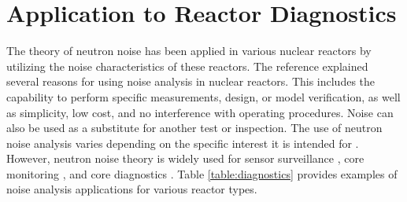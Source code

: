 \section{Application to Reactor Diagnostics}

The theory of neutron noise has been applied in various nuclear reactors by utilizing the noise characteristics of these reactors. The reference \cite{thiePowerReactorNoise1981} explained several reasons for using noise analysis in nuclear reactors. This includes the capability to perform specific measurements, design, or model verification, as well as simplicity, low cost, and no interference with operating procedures. Noise can also be used as a substitute for another test or inspection. The use of neutron noise analysis varies depending on the specific interest it is intended for \cite{torresNeutronNoiseAnalysis2019}. However, neutron noise theory is widely used for sensor surveillance \cite{hashemianMeasurementDynamicTemperatures2011, hashemianPracticalReviewMethods2010, montalvoAdvancedSurveillanceResistance2014}, core monitoring \cite{czibokRegularNeutronNoise2003, hashemianOnlineMonitoringApplications2011, ortiz-villafuerteBWROnlineMonitoring2006}, and core diagnostics \cite{pazsitDevelopmentsCoreBarrelMotion2016, montalvoFirstEvidencePivotal2016}. Table \ref{table:diagnostics} provides examples of noise analysis applications for various reactor types.

